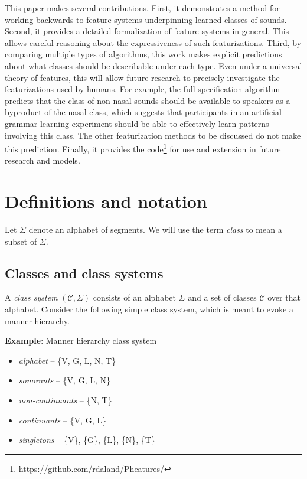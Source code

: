\documentclass[11pt, oneside]{article}   	%
\begin{document}
This paper makes several contributions. First, it demonstrates a method for working backwards to feature systems underpinning learned classes of sounds. Second, it provides a detailed formalization of feature systems in general. This allows careful reasoning about the expressiveness of such featurizations. Third, by comparing multiple types of algorithms, this work makes explicit predictions about what classes should be describable under each type. Even under a universal theory of features, this will allow future research to precisely investigate the featurizations used by humans. For example, the full specification algorithm predicts that the class of non-nasal sounds should be available to speakers as a byproduct of the nasal class, which suggests that participants in an artificial grammar learning experiment should be able to effectively learn patterns involving this class. The other featurization methods to be discussed do not make this prediction. Finally, it provides the code\footnote{https://github.com/rdaland/Pheatures/} for use and extension in future research and models. 

\FloatBarrier
\section{Definitions and notation}
\label{sec:definitions}
Let $\Sigma$ denote an alphabet of segments. We will use the term \textit{class} to mean a subset of $\Sigma$.

\subsection{Classes and class systems}

A \textit{class system} $(\mathcal C, \Sigma)$ consists of an alphabet $\Sigma$ and a set of classes $\mathcal C$ over that alphabet. Consider the following simple class system, which is meant to evoke a manner hierarchy.

\vspace{\baselineskip} \noindent \textbf{Example}: Manner hierarchy class system \begin{itemize}
  \item \textit{alphabet} -- \{V, G, L, N, T\}
  \item \textit{sonorants} -- \{V, G, L, N\}
  \item \textit{non-continuants} -- \{N, T\}
  \item \textit{continuants} -- \{V, G, L\}
  \item \textit{singletons} -- \{V\}, \{G\}, \{L\}, \{N\}, \{T\}
  \end{itemize}
\end{document}
